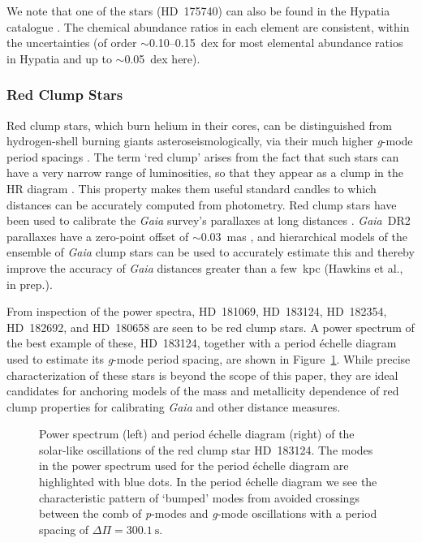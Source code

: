 \documentclass[modern]{aastex62}
\newcommand{\gaia}{\textit{Gaia}\xspace}
\begin{document}
We note that one of the stars (HD~175740) can also be found in the Hypatia catalogue \citep{hypatia}. The chemical abundance ratios in each element are consistent, within the uncertainties (of order $\sim$0.10--0.15~dex for most elemental abundance ratios in Hypatia and up to $\sim$0.05~dex here). 

\subsubsection{Red Clump Stars}
\label{clumpstars}

Red clump stars, which burn helium in their cores, can be distinguished from hydrogen-shell burning giants asteroseismologically, via their much higher \textit{g}-mode period spacings \citep{rggmodehelium}. 
The term `red clump' arises from the fact that such stars can have a very narrow range of luminosities, so that they appear as a clump in the HR diagram \citep{2016ARA&A..54...95G}. This property makes them useful standard candles to which distances can be accurately computed from photometry. Red clump stars have been used to calibrate the \gaia survey's parallaxes at long distances \citep{2017A&A...598L...4D,2017MNRAS.471..722H,2018A&A...609A.116R}. \gaia~DR2 parallaxes have a zero-point offset of $\sim 0.03$~mas \citep{gaiadr2parallax}, and hierarchical models of the ensemble of \gaia clump stars can be used to accurately estimate this and thereby improve the accuracy of \gaia distances greater than a few~kpc (Hawkins et al., in prep.).

From inspection of the power spectra, HD~181069, HD~183124, HD~182354, HD~182692, and HD~180658 are seen to be red clump stars. A power spectrum of the best example of these, HD~183124, together with a period \'{e}chelle diagram used to estimate its \textit{g}-mode period spacing, are shown in Figure~\ref{HD_183124}. While precise characterization of these stars is beyond the scope of this paper, they are ideal candidates for anchoring models of the mass and metallicity dependence of red clump properties for calibrating \gaia and other distance measures. 

\begin{figure*}

\caption{\label{HD_183124}
Power spectrum (left) and period \'{e}chelle diagram (right) of the solar-like oscillations of the red clump star HD~183124. The modes in the power spectrum used for the period \'{e}chelle diagram are highlighted with blue dots. In the period \'{e}chelle diagram we see the characteristic pattern of `bumped' modes from avoided crossings between the comb of \textit{p}-modes and \textit{g}-mode oscillations with a period spacing of $\Delta \Pi = 300.1~\text{s}$.}
\end{figure*}
\end{document}
